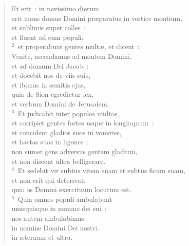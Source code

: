 \begin{flushleft}\begin{verse}\vspace{-19pt}Et erit~: in novissimo dierum\\ erit mons domus Domini pr\ae paratus in vertice montium,\\ et sublimis super colles~:\\ et fluent ad eum populi,\\
${}^{2}$~et properabunt gentes mult\ae , et dicent~:\\ Venite, ascendamus ad montem Domini,\\ et ad domum Dei Jacob~:\\ et docebit nos de viis suis,\\ et ibimus in semitis ejus,\\ quia de Sion egredietur lex,\\ et verbum Domini de Jerusalem.\\
${}^{3}$~Et judicabit inter populos multos,\\ et corripiet gentes fortes usque in longinquum~:\\ et concident gladios suos in vomeres,\\ et hastas suas in ligones~:\\ non sumet gens adversus gentem gladium,\\ et non discent ultra belligerare.\\
${}^{4}$~Et sedebit vir subtus vitem suam et subtus ficum suam,\\ et non erit qui deterreat,\\ quia os Domini exercituum locutum est.\\
${}^{5}$~Quia omnes populi ambulabunt\\ unusquisque in nomine dei sui~;\\ nos autem ambulabimus\\ in nomine Domini Dei nostri,\\ in \ae ternum et ultra.\end{verse}\end{flushleft}


